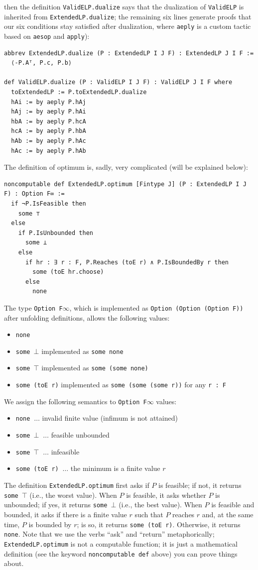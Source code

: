 \documentclass[]{article}
\renewcommand{\.}{\hskip .75pt}
\begin{document}
then the definition \texttt{ValidELP.dualize} says that the dualization of \texttt{ValidELP}
is inherited from \texttt{ExtendedLP.dualize}; the remaining six lines generate
proofs that our six conditions stay satisfied after dualization,
where \texttt{aeply} is a custom tactic based on \texttt{aesop} \cite{Aesop}
and \texttt{apply}):
\begin{lstlisting}
abbrev ExtendedLP.dualize (P : ExtendedLP I J F) : ExtendedLP J I F :=
  ⟨-P.Aᵀ, P.c, P.b⟩

def ValidELP.dualize (P : ValidELP I J F) : ValidELP J I F where
  toExtendedLP := P.toExtendedLP.dualize
  hAi := by aeply P.hAj
  hAj := by aeply P.hAi
  hbA := by aeply P.hcA
  hcA := by aeply P.hbA
  hAb := by aeply P.hAc
  hAc := by aeply P.hAb
\end{lstlisting}
The definition of optimum is, sadly, very complicated (will be explained below):
\begin{lstlisting}
noncomputable def ExtendedLP.optimum [Fintype J] (P : ExtendedLP I J F) : Option F∞ :=
  if ¬P.IsFeasible then
    some ⊤
  else
    if P.IsUnbounded then
      some ⊥
    else
      if hr : ∃ r : F, P.Reaches (toE r) ∧ P.IsBoundedBy r then
        some (toE hr.choose)
      else
        none
\end{lstlisting}
The type \texttt{Option F$\infty$}, which is implemented as
\texttt{Option (Option (Option F))} after unfolding definitions,
allows the following values:
\begin{itemize}
\item \texttt{none}
\item \texttt{some $\bot$} implemented as \texttt{some none}
\item \texttt{some $\top$} implemented as \texttt{some (some none)}
\item \texttt{some (toE r)} implemented as \texttt{some (some (some r))} for any \texttt{r :~F}
\end{itemize}
We assign the following semantics to \texttt{Option F$\infty$} values:
\begin{itemize}
\item \texttt{none} $\ \dots$ invalid finite value (infimum is not attained)
\item \texttt{some $\bot$} $\ \dots$ feasible unbounded
\item \texttt{some $\top$} $\ \dots$ infeasible
\item \texttt{some (toE r)} $\ \dots$ the minimum is a finite value $r$
\end{itemize}
The definition \texttt{ExtendedLP.optimum} first asks if $P$ is feasible;
if not, it returns \texttt{some $\top$} (i.e., the worst value).
When $P$ is feasible, it asks whether $P$ is unbounded; if yes, it returns \texttt{some $\bot$}
(i.e., the best value).
When $P$ is feasible and bounded,
it asks if there is a finite value $r$ such that $P$ reaches $r$ and, at the same time,
$P$ is bounded by $r$; is so, it returns \texttt{some (toE r)}.
Otherwise, it returns \texttt{none}.
Note that we use the verbs ``ask'' and ``return'' metaphorically;
\texttt{ExtendedLP.optimum} is not a computable function; it is just a mathematical
definition (see the keyword \texttt{noncomputable def} above) you can prove things about.
\end{document}
